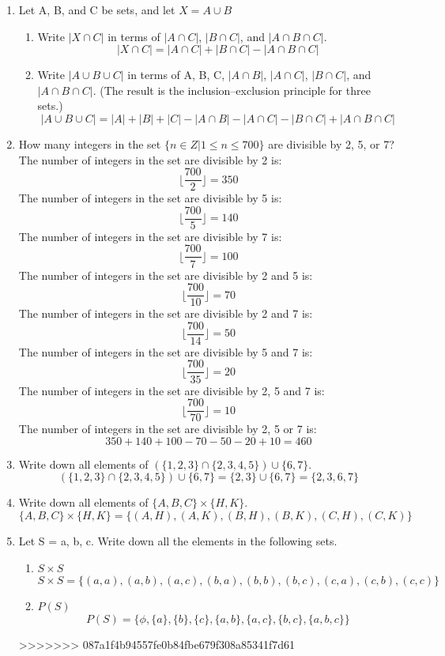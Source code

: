 \documentclass[12pt]{article}
\begin{document}
\begin{enumerate}
  \item Let A, B, and C be sets, and let $X = A \cup B$
  \begin{enumerate}
    \item Write $|X \cap C|$ in terms of $|A \cap C|$, $|B \cap C|$, and $|A \cap B \cap C|$. 
    \[|X \cap C| = |A \cap C| + |B \cap C| - |A \cap B \cap C|\]
    \item Write $|A \cup B \cup C|$ in terms of A, B, C, $|A \cap B|$, $|A \cap C|$, $|B \cap C|$, and $|A \cap B \cap C|$. (The result is the inclusion–exclusion principle for three sets.)
    \[|A \cup B \cup C| = |A| + |B| + |C| - |A \cap B| - |A \cap C| - |B \cap C| + |A \cap B \cap C|\]
  \end{enumerate}
  \item How many integers in the set $\{n \in Z | 1 \leq n \leq 700\}$ are divisible by 2, 5, or 7?
  The number of integers in the set are divisible by 2 is:
    \[\lfloor \frac{700}{2} \rfloor = 350\]
  The number of integers in the set are divisible by 5 is:
    \[\lfloor \frac{700}{5} \rfloor = 140\]
  The number of integers in the set are divisible by 7 is:
    \[\lfloor \frac{700}{7} \rfloor = 100\]
  The number of integers in the set are divisible by 2 and 5 is:
    \[\lfloor \frac{700}{10} \rfloor = 70\]
  The number of integers in the set are divisible by 2 and 7 is:
    \[\lfloor \frac{700}{14} \rfloor = 50\]
  The number of integers in the set are divisible by 5 and 7 is:
    \[\lfloor \frac{700}{35} \rfloor = 20\]
  The number of integers in the set are divisible by 2, 5 and 7 is:
    \[\lfloor \frac{700}{70} \rfloor = 10\]
  The number of integers in the set are divisible by 2, 5 or 7 is:
    \[350 + 140 + 100 - 70 - 50 - 20 + 10 = 460\]

  \item Write down all elements of $(\{1,2,3\} \cap \{2,3,4,5\}) \cup \{6,7\}$.
  \[(\{1,2,3\} \cap \{2,3,4,5\}) \cup \{6,7\} = \{2,3\} \cup \{6,7\} = \{2,3,6,7\}\]
  \item Write down all elements of $\{A, B, C\} \times \{H, K\}$.
  \[\{A, B, C\} \times \{H, K\} = \{(A,H),(A,K),(B,H),(B,K),(C,H),(C,K)\}\]
  \item Let S = {a, b, c}. Write down all the elements in the following sets.
  \begin{enumerate}
    \item $S \times S$
      \[S \times S = \{(a,a),(a,b),(a,c),(b,a),(b,b),(b,c),(c,a),(c,b),(c,c)\}\]
    \item $P(S)$
      \[P(S) = \{\phi, \{a\}, \{b\}, \{c\}, \{a,b\}, \{a,c\}, \{b,c\}, \{a,b,c\}\}\]
  \end{enumerate}

>>>>>>> 087a1f4b94557fe0b84fbe679f308a85341f7d61
\end{enumerate}
\end{document}
